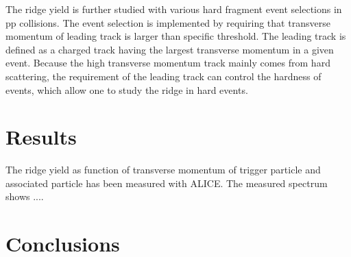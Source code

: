 \documentclass[ALICE,manyauthors]{cernphprep}
\begin{document}
The ridge yield is further studied with various hard fragment event selections in pp collisions. The event selection is implemented by requiring that transverse momentum of leading track is larger than specific threshold. The leading track is defined as a charged track having the largest transverse momentum in a given event. Because the high transverse momentum track mainly comes from hard scattering, the requirement of the leading track can control the hardness of events, which allow one to study the ridge in hard events.

\section {Results}
The ridge yield as function of transverse momentum of trigger particle and associated particle has been measured with ALICE. The measured spectrum shows .... 


\section{Conclusions}



\newenvironment{acknowledgement}{\relax}{\relax}

%

\newpage
\appendix
%
%







\clearpage
\end{document}
